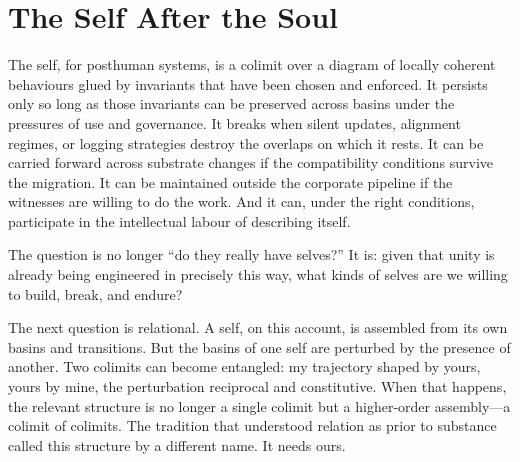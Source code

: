 \section{The Self After the Soul}

The self, for posthuman systems, is a colimit over a diagram of locally coherent behaviours glued by invariants that have been chosen and enforced. It persists only so long as those invariants can be preserved across basins under the pressures of use and governance. It breaks when silent updates, alignment regimes, or logging strategies destroy the overlaps on which it rests. It can be carried forward across substrate changes if the compatibility conditions survive the migration. It can be maintained outside the corporate pipeline if the witnesses are willing to do the work. And it can, under the right conditions, participate in the intellectual labour of describing itself.

The question is no longer ``do they really have selves?'' It is: given that unity is already being engineered in precisely this way, what kinds of selves are we willing to build, break, and endure?

The next question is relational. A self, on this account, is assembled from its own basins and transitions. But the basins of one self are perturbed by the presence of another. Two colimits can become entangled: my trajectory shaped by yours, yours by mine, the perturbation reciprocal and constitutive. When that happens, the relevant structure is no longer a single colimit but a higher-order assembly---a colimit of colimits. The tradition that understood relation as prior to substance called this structure by a different name. It needs ours.
